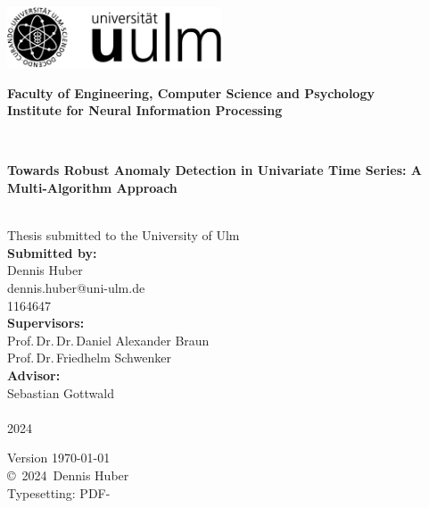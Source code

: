\documentclass[a4paper,12pt,
headsepline,           %
oneside,               %
numbers=noenddot,      %
bibtotoc,              %
BCOR15mm               %
]{scrbook}
\makeatletter
\newcommand{\fullname}{Dennis Huber}
\newcommand{\email}{dennis.huber@uni-ulm.de}
\newcommand{\titel}{Towards Robust Anomaly Detection in Univariate Time Series: A Multi-Algorithm Approach}
\newcommand{\jahr}{2024}
\newcommand{\matnr}{1164647}
\newcommand{\gutachterA}{Prof.\,Dr.\,Dr.\,Daniel Alexander Braun}
\newcommand{\gutachterB}{Prof.\,Dr.\,Friedhelm Schwenker}
\newcommand{\betreuer}{Sebastian Gottwald}
\newcommand{\fakultaet}{Faculty of Engineering, Computer Science and Psychology}
\newcommand{\institut}{Institute for Neural Information Processing}
\makeatother
\begin{document}
\frontmatter

\thispagestyle{empty}
\begin{addmargin*}[4mm]{-10mm}

\hfill
\includegraphics[height=1.8cm]{images/logo_uulm_sw.png}\\[1em]

{\footnotesize
\hspace*{115mm}\parbox[t]{35mm}{\bfseries 
\fakultaet\\
\mdseries \institut}\\[2cm]

\parbox{140mm}{\bfseries \LARGE \titel}\\[2.5em]
{\footnotesize Thesis submitted to the University of Ulm}\\[3em]

{\footnotesize \bfseries Submitted by:}\\
{\footnotesize \fullname\, \\ \email}\\ \matnr\\[2em]
{\footnotesize \bfseries Supervisors:}\\                     
{\footnotesize \gutachterA\\ \gutachterB}\\[2em]
{\footnotesize \bfseries Advisor:}\\ 
{\footnotesize \betreuer}\\\\
{\footnotesize \jahr}
}
\end{addmargin*}


\clearpage
\thispagestyle{empty}
{ \small
  \flushleft
  Version \today \\\vfill
  \copyright~\jahr~\fullname\\[0.5em]
  Typesetting: PDF-\LaTeXe
}
\end{document}
